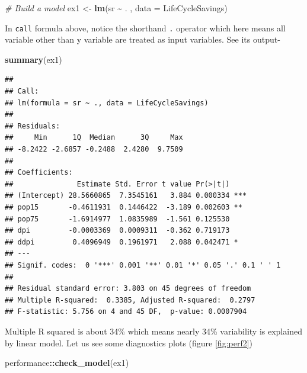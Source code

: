\documentclass[
]{book}
\newenvironment{Shaded}{\begin{snugshade}}{\end{snugshade}}
\newcommand{\AttributeTok}[1]{\textcolor[rgb]{0.13,0.29,0.53}{#1}}
\newcommand{\CommentTok}[1]{\textcolor[rgb]{0.56,0.35,0.01}{\textit{#1}}}
\newcommand{\FunctionTok}[1]{\textcolor[rgb]{0.13,0.29,0.53}{\textbf{#1}}}
\newcommand{\NormalTok}[1]{#1}
\newcommand{\OtherTok}[1]{\textcolor[rgb]{0.56,0.35,0.01}{#1}}
\newcommand{\SpecialCharTok}[1]{\textcolor[rgb]{0.81,0.36,0.00}{\textbf{#1}}}
\begin{document}
\begin{Shaded}
\begin{Highlighting}[]
\CommentTok{\# Build a model}
\NormalTok{ex1 }\OtherTok{\textless{}{-}} \FunctionTok{lm}\NormalTok{(sr }\SpecialCharTok{\textasciitilde{}}\NormalTok{ . , }\AttributeTok{data =}\NormalTok{ LifeCycleSavings)}
\end{Highlighting}
\end{Shaded}

In \texttt{call} formula above, notice the shorthand \texttt{.} operator which here means all variable other than y variable are treated as input variables. See its output-

\begin{Shaded}
\begin{Highlighting}[]
\FunctionTok{summary}\NormalTok{(ex1)}
\end{Highlighting}
\end{Shaded}

\begin{verbatim}
## 
## Call:
## lm(formula = sr ~ ., data = LifeCycleSavings)
## 
## Residuals:
##     Min      1Q  Median      3Q     Max 
## -8.2422 -2.6857 -0.2488  2.4280  9.7509 
## 
## Coefficients:
##               Estimate Std. Error t value Pr(>|t|)    
## (Intercept) 28.5660865  7.3545161   3.884 0.000334 ***
## pop15       -0.4611931  0.1446422  -3.189 0.002603 ** 
## pop75       -1.6914977  1.0835989  -1.561 0.125530    
## dpi         -0.0003369  0.0009311  -0.362 0.719173    
## ddpi         0.4096949  0.1961971   2.088 0.042471 *  
## ---
## Signif. codes:  0 '***' 0.001 '**' 0.01 '*' 0.05 '.' 0.1 ' ' 1
## 
## Residual standard error: 3.803 on 45 degrees of freedom
## Multiple R-squared:  0.3385, Adjusted R-squared:  0.2797 
## F-statistic: 5.756 on 4 and 45 DF,  p-value: 0.0007904
\end{verbatim}

Multiple R squared is about 34\% which means nearly 34\% variability is explained by linear model. Let us see some diagnostics plots (figure \ref{fig:perf2})

\begin{Shaded}
\begin{Highlighting}[]
\NormalTok{performance}\SpecialCharTok{::}\FunctionTok{check\_model}\NormalTok{(ex1)}
\end{Highlighting}
\end{Shaded}
\end{document}
